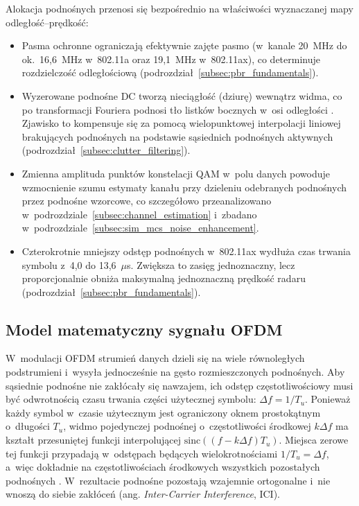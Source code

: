 Alokacja podnośnych przenosi się bezpośrednio na właściwości wyznaczanej mapy odległość--prędkość:
\begin{itemize}
    \item Pasma ochronne ograniczają efektywnie zajęte pasmo (w~kanale 20~MHz do ok.~16,6~MHz w~802.11a oraz 19,1~MHz w~802.11ax), co determinuje rozdzielczość odległościową (podrozdział~\ref{subsec:pbr_fundamentals}).
    \item Wyzerowane podnośne DC tworzą nieciągłość (dziurę) wewnątrz widma, co po transformacji Fouriera podnosi tło listków bocznych w~osi odległości \cite{braun2014}. Zjawisko to kompensuje się za pomocą wielopunktowej interpolacji liniowej brakujących podnośnych na podstawie sąsiednich podnośnych aktywnych (podrozdział~\ref{subsec:clutter_filtering}).
    \item Zmienna amplituda punktów konstelacji QAM w~polu danych powoduje wzmocnienie szumu estymaty kanału przy dzieleniu odebranych podnośnych przez podnośne wzorcowe, co szczegółowo przeanalizowano w~podrozdziale~\ref{subsec:channel_estimation} i~zbadano w~podrozdziale~\ref{subsec:sim_mcs_noise_enhancement}.
    \item Czterokrotnie mniejszy odstęp podnośnych w~802.11ax wydłuża czas trwania symbolu z~4,0 do 13,6~$\mu$s. Zwiększa to zasięg jednoznaczny, lecz proporcjonalnie obniża maksymalną jednoznaczną prędkość radaru (podrozdział~\ref{subsec:pbr_fundamentals}).
\end{itemize}

\subsection{Model matematyczny sygnału OFDM}
\label{subsec:ofdm_modulation}

W~modulacji OFDM strumień danych dzieli się na wiele równoległych podstrumieni i~wysyła jednocześnie na gęsto rozmieszczonych podnośnych. Aby sąsiednie podnośne nie zakłócały się nawzajem, ich odstęp częstotliwościowy musi być odwrotnością czasu trwania części użytecznej symbolu: $\Delta f = 1/T_u$. Ponieważ każdy symbol w~czasie użytecznym jest ograniczony oknem prostokątnym o~długości $T_u$, widmo pojedynczej podnośnej o~częstotliwości środkowej $k\Delta f$ ma kształt przesuniętej funkcji interpolującej $\mathrm{sinc}((f - k\Delta f)T_u)$. Miejsca zerowe tej funkcji przypadają w~odstępach będących wielokrotnościami $1/T_u = \Delta f$, a~więc dokładnie na częstotliwościach środkowych wszystkich pozostałych podnośnych \cite{zielinski2007}. W~rezultacie podnośne pozostają wzajemnie ortogonalne i~nie wnoszą do siebie zakłóceń (ang. \textit{Inter-Carrier Interference}, ICI).

